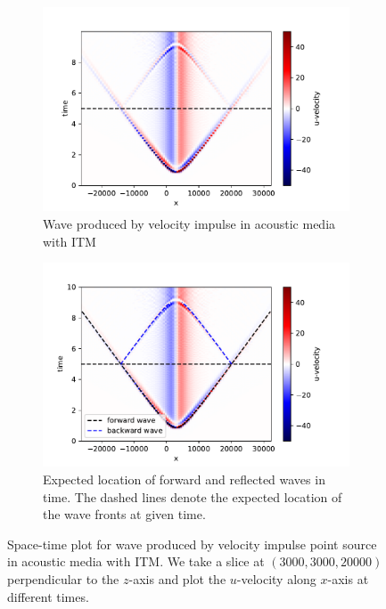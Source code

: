 \begin{figure}[htpb]
\begin{subfigure}[t]{0.49\textwidth}   
    \centering 
    \includegraphics[width=\textwidth]{figures/AcousticITM.pdf}
    \caption{Wave produced by velocity impulse in acoustic media with \ac{ITM}}
\end{subfigure}
\hfill
\begin{subfigure}[t]{0.49\textwidth}
    \centering 
    \includegraphics[width=\textwidth]{figures/AcousticITMAnnotated.pdf}
    \caption{Expected location of forward and reflected waves in time. The dashed lines denote the expected location of the wave fronts at given time.}
    \label{subfig:acousticITMAnnotated}
\end{subfigure}
\caption{Space-time plot for wave produced by velocity impulse point source in acoustic media with \ac{ITM}. We take a slice at $\left(3000,3000,20000\right)$ perpendicular to the $z$-axis
and plot the $u$-velocity along $x$-axis at different times.}
\label{fig:space-timeplot-acousticITM}
\end{figure}


